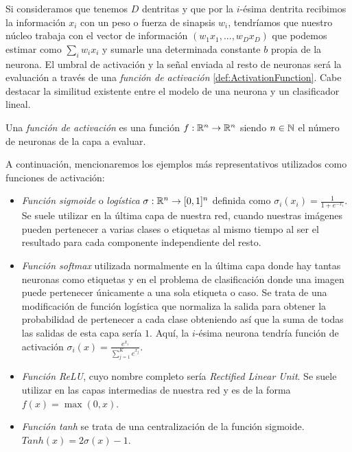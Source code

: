 Si consideramos que tenemos $D$ dentritas y que por la $i$-ésima dentrita recibimos la información $x_i$ con un peso o fuerza de sinapsis $w_i$, tendríamos que nuestro núcleo trabaja con el vector de información $(w_1 x_1,...,w_D x_D)$ que podemos estimar como $\sum_i w_i x_i $ y sumarle una determinada constante $b$ propia de la neurona. El umbral de activación y la señal enviada al resto de neuronas será la evaluación a través de una \emph{función de activación} \autoref{def:ActivationFunction}. Cabe destacar la similitud existente entre el modelo de una neurona y un clasificador lineal.\newline

\begin{definicion}\label{def:ActivationFunction}
Una \emph{función de activación} es una función $f: \mathbb{R}^n \to \mathbb{R}^n$ siendo $n\in\mathbb{N}$ el número de neuronas de la capa a evaluar.
\end{definicion}

A continuación, mencionaremos los ejemplos más representativos utilizados como funciones de activación:

\begin{itemize}
\item \emph{Función sigmoide} o \emph{logística} $\sigma: \mathbb{R}^n \to [0,1]^n$ definida como $\sigma_i(x_i)=\frac{1}{1+e^{-x_i}} $. Se suele utilizar en la última capa de nuestra red, cuando nuestras imágenes pueden pertenecer a varias clases o etiquetas al mismo tiempo al ser el resultado para cada componente independiente del resto.
\item \emph{Función softmax} utilizada normalmente en la última capa donde hay tantas neuronas como etiquetas y en el problema de clasificación donde una imagen puede pertenecer únicamente a una sola etiqueta o caso. Se trata de una modificación de función logística que normaliza la salida para obtener la probabilidad de pertenecer a cada clase obteniendo así que la suma de todas las salidas de esta capa sería $1$. Aquí, la $i$-ésima neurona tendría función de activación $\sigma_i(x)=\frac{e^{x_i}}{\sum_{j=1}^K e^{x_j}}$. %
\item \emph{Función ReLU}, cuyo nombre completo sería \emph{Rectified Linear Unit}. Se suele utilizar en las capas intermedias de nuestra red y es de la forma $f(x)=\max(0,x)$.
\item \emph{Función tanh} se trata de una centralización de la función sigmoide. $Tanh(x)=2\sigma(x)-1$.
\end{itemize}

